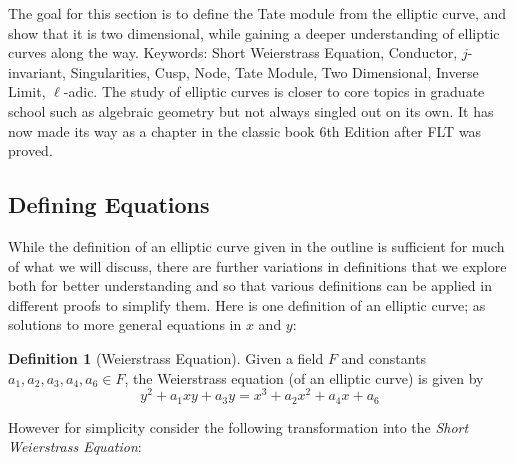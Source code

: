 \documentclass{article}
\theoremstyle{definition}
\newtheorem{definition}{Definition}[section]
\theoremstyle{definition}
\theoremstyle{definition}
\begin{document}
The goal for this section is to define the Tate module from the elliptic curve, and show that it is two dimensional, while gaining a deeper understanding of elliptic curves along the way.
\newline\newline
Keywords: Short Weierstrass Equation, Conductor, $j$-invariant, Singularities, Cusp, Node, Tate Module, Two Dimensional, Inverse Limit, $\ell$-adic. 
\newline\newline
The study of elliptic curves is closer to core topics in graduate school such as algebraic geometry but not always singled out on its own. It has now made its way as a chapter in the classic book \cite{HW} 6th Edition after FLT was proved.

\subsection{Defining Equations}

While the definition of an elliptic curve given in the outline is sufficient for much of what we will discuss, there are further variations in definitions that we explore both for better understanding and so that various definitions can be applied in different proofs to simplify them.
\newline\newline
Here is one definition of an elliptic curve; as solutions to more general equations in $x$ and $y$:
\begin{definition}[Weierstrass Equation] Given a field $F$ and constants $a_1,a_2,a_3,a_4,a_6\in F$, the Weierstrass equation (of an elliptic curve) is given by
$$y^2+a_1xy+a_3y=x^3+a_2x^2+a_4x+a_6$$

\end{definition}
However for simplicity consider the following transformation into the \emph{Short Weierstrass Equation}:
\end{document}
